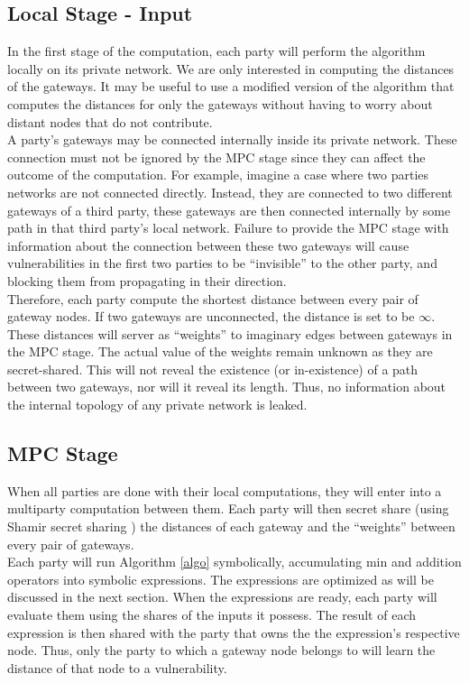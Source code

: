 \subsection{Local Stage - Input}
In the first stage of the computation, each party will perform the algorithm locally on its private network. We are only interested in computing the distances of the gateways. It may be useful to use a modified version of the algorithm that computes the distances for only the gateways without having to worry about distant nodes that do not contribute. \\

A party's gateways may be connected internally inside its private network. These connection must not be ignored by the MPC stage since they can affect the outcome of the computation. For example, imagine a case where two parties networks are not connected directly. Instead, they are connected to two different gateways of a third party, these gateways are then connected internally by some path in that third party's local network. Failure to provide the MPC stage with information about the connection between these two gateways will cause vulnerabilities in the first two parties to be ``invisible'' to the other party, and blocking them from propagating in their direction. \\

Therefore, each party compute the shortest distance between every pair of gateway nodes. If two gateways are unconnected, the distance is set to be $\infty$. These distances will server as ``weights'' to imaginary edges between gateways in the MPC stage. The actual value of the weights remain unknown as they are secret-shared. This will not reveal the existence (or in-existence) of a path between two gateways, nor will it reveal its length. Thus, no information about the internal topology of any private network is leaked. \\

\subsection{MPC Stage}
When all parties are done with their local computations, they will enter into a multiparty computation between them. Each party will then secret share (using Shamir secret sharing \cite{shamirsharing}) the distances of each gateway and the ``weights'' between every pair of gateways. \\

Each party will run Algorithm \ref{algo} symbolically, accumulating min and addition operators into symbolic expressions. The expressions are optimized as will be discussed in the next section. When the expressions are ready, each party will evaluate them using the shares of the inputs it possess. The result of each expression is then shared with the party that owns the the expression's respective node. Thus, only the party to which a gateway node belongs to will learn the distance of that node to a vulnerability. 

